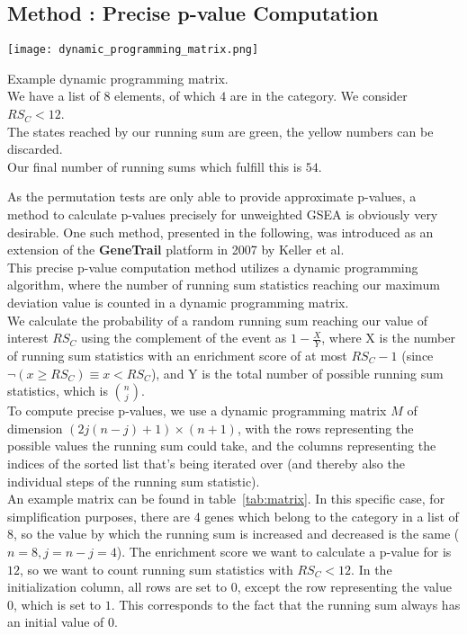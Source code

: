 \subsection{Method : Precise p-value Computation}\label{subsec:p-value-precise}
\begin{table}
	\centering
	\texttt{[image: dynamic\_programming\_matrix.png]}
	\caption{Example dynamic programming matrix.\\We have a list of $8$ elements, of which $4$ are in the category. We consider $RS_{C}<12$.\\The states reached by our running sum are green, the yellow numbers can be discarded.\\Our final number of running sums which fulfill this is $54$.}
	\label{tab:matrix}
\end{table}
As the permutation tests are only able to provide approximate p-values, a method to calculate p-values precisely for unweighted GSEA is obviously very desirable. One such method, presented in the following, was introduced as an extension of the \textbf{GeneTrail} platform in 2007 by Keller et al.~\cite{genetrail_original, genetrail_dynamic_programming}\\
This precise p-value computation method utilizes a dynamic programming algorithm, where the number of running sum statistics reaching our maximum deviation value is counted in a dynamic programming matrix.\\
We calculate the probability of a random running sum reaching our value of interest $RS_{C}$ using the complement of the event as $1 - \frac{X}{Y}$, where X is the number of running sum statistics with an enrichment score of at most $RS_{C}-1$ (since $\neg \left(x \geq RS_{C}\right) \equiv x < RS_{C}$), and Y is the total number of possible running sum statistics, which is $\binom{n}{j}$.\\
To compute precise p-values, we use a dynamic programming matrix $M$ of dimension $\left(2j\left(n-j\right)+1\right) \times \left(n+1\right)$, with the rows representing the possible values the running sum could take, and the columns representing the indices of the sorted list that's being iterated over (and thereby also the individual steps of the running sum statistic).\\
An example matrix can be found in table~\ref{tab:matrix}. In this specific case, for simplification purposes, there are 4 genes which belong to the category in a list of 8, so the value by which the running sum is increased and decreased is the same ($n=8, j=n-j=4$). The enrichment score we want to calculate a p-value for is $12$, so we want to count running sum statistics with $RS_{C}<12$. In the initialization column, all rows are set to $0$, except the row representing the value $0$, which is set to $1$. This corresponds to the fact that the running sum always has an initial value of $0$.
